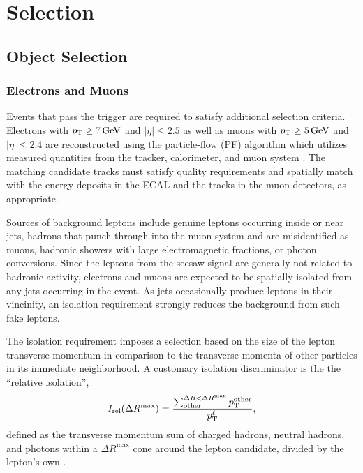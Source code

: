\chapter{Selection}
\label{chap:Selection}

\section{Object Selection}
\label{sec:Selection/Object}

\subsection{Electrons and Muons}
Events that pass the trigger are required to satisfy additional selection criteria. Electrons with $p_{\mathrm{T}} \geq 7\,\text{Ge\hspace{-.08em}V}$ and $|\eta| \leq 2.5$ as well as muons with $p_{\mathrm{T}} \geq 5\,\text{Ge\hspace{-.08em}V}$ and $|\eta| \leq 2.4$ are reconstructed using the particle-flow (PF) algorithm which utilizes measured quantities from the tracker, calorimeter, and muon system \cite{CMS-PAS-PFT-09-001}. The matching candidate tracks must satisfy quality requirements and spatially match with the energy deposits in the ECAL and the tracks in the muon detectors, as appropriate.

Sources of background leptons include genuine leptons occurring inside or near jets, hadrons that punch through into the muon system and are misidentified as muons, hadronic showers with large electromagnetic fractions, or photon conversions. Since the leptons from the seesaw signal are generally not related to hadronic activity, electrons and muons are expected to be spatially isolated from any jets occurring in the event. As jets occasionally produce leptons in their vincinity, an isolation requirement strongly reduces the background from such fake leptons.

The isolation requirement imposes a selection based on the size of the lepton transverse momentum in comparison to the transverse momenta of other particles in its immediate neighborhood. A customary isolation discriminator is the the ``relative isolation'',
\begin{equation}
	I_\text{rel}(\Delta R^\textrm{max}) = \frac{\sum_\text{other}^{\Delta R < \Delta R^\textrm{max}} p_{\mathrm{T}}^\text{other}}{p_{\mathrm{T}}^\ell},
\end{equation}
defined as the transverse momentum sum of charged hadrons, neutral hadrons, and photons within a $\Delta R^\textrm{max}$ cone around the lepton candidate, divided by the lepton's own \pt.

